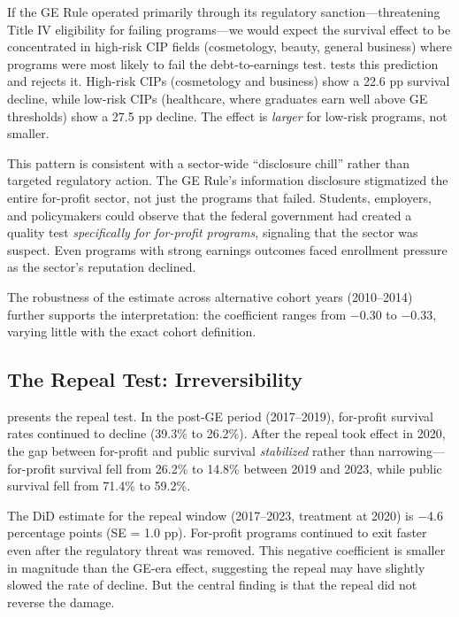 \documentclass[12pt]{article}
\begin{document}


If the GE Rule operated primarily through its regulatory sanction---threatening Title IV eligibility for failing programs---we would expect the survival effect to be concentrated in high-risk CIP fields (cosmetology, beauty, general business) where programs were most likely to fail the debt-to-earnings test.  tests this prediction and rejects it. High-risk CIPs (cosmetology and business) show a 22.6 pp survival decline, while low-risk CIPs (healthcare, where graduates earn well above GE thresholds) show a 27.5 pp decline. The effect is \textit{larger} for low-risk programs, not smaller.

This pattern is consistent with a sector-wide ``disclosure chill'' rather than targeted regulatory action. The GE Rule's information disclosure stigmatized the entire for-profit sector, not just the programs that failed. Students, employers, and policymakers could observe that the federal government had created a quality test \textit{specifically for for-profit programs}, signaling that the sector was suspect. Even programs with strong earnings outcomes faced enrollment pressure as the sector's reputation declined.

The robustness of the estimate across alternative cohort years (2010--2014) further supports the interpretation: the coefficient ranges from $-$0.30 to $-$0.33, varying little with the exact cohort definition.

\subsection{The Repeal Test: Irreversibility}



 presents the repeal test. In the post-GE period (2017--2019), for-profit survival rates continued to decline (39.3\% to 26.2\%). After the repeal took effect in 2020, the gap between for-profit and public survival \textit{stabilized} rather than narrowing---for-profit survival fell from 26.2\% to 14.8\% between 2019 and 2023, while public survival fell from 71.4\% to 59.2\%.

The DiD estimate for the repeal window (2017--2023, treatment at 2020) is $-$4.6 percentage points (SE = 1.0 pp). For-profit programs continued to exit faster even after the regulatory threat was removed. This negative coefficient is smaller in magnitude than the GE-era effect, suggesting the repeal may have slightly slowed the rate of decline. But the central finding is that the repeal did not reverse the damage.
\end{document}

